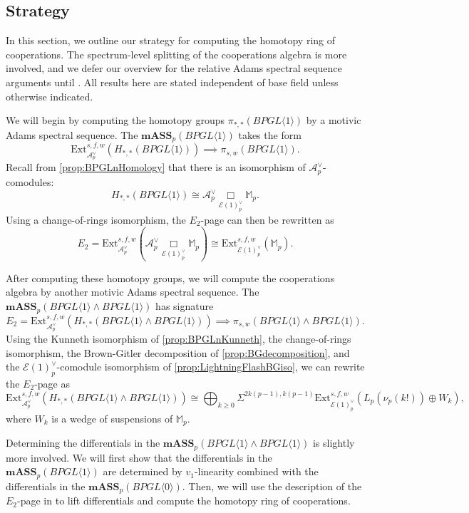 \documentclass{amsart}
\theoremstyle{plain}
\numberwithin{theorem}{section}
\numberwithin{equation}{section}
\numberwithin{figure}{section}
\newcommand{\0}{\langle 0 \rangle }
\begin{document}
\subsection{Strategy}
In this section, we outline our strategy for computing the homotopy ring of cooperations. The spectrum-level splitting of the cooperations algebra is more involved, and we defer our overview for the relative Adams spectral sequence arguments until . All results here are stated independent of base field unless otherwise indicated. 

We will begin by computing the homotopy groups $\pi_{*,*}(BPGL \langle 1 \rangle)$ by a motivic Adams spectral sequence. The $\textbf{mASS}_p(BPGL \langle 1 \rangle)$ takes the form
\[\text{Ext}^{s,f,w}_{\mathcal{A}_p^\vee}(H_{*,*}(BPGL \langle 1 \rangle)) \implies \pi_{s,w}(BPGL \langle 1 \rangle).\]
Recall from \cref{prop:BPGLnHomology} that there is an isomorphism of $\mathcal{A}^\vee_p$-comodules:
\[H_{*,*}(BPGL \langle 1 \rangle) \cong \mathcal{A}^\vee_p\underset{\mathcal{E}(1)^\vee_p}{\Box}\mathbb{M}_p.\]
Using a change-of-rings isomorphism, the $E_2$-page can then be rewritten as 
\[E_2 = \text{Ext}^{s,f,w}_{\mathcal{A}^\vee_p}(\mathcal{A}^\vee_p\underset{\mathcal{E}(1)^\vee_p}{\Box}\mathbb{M}_p) \cong \text{Ext}^{s,f,w}_{\mathcal{E}(1)^\vee_p}(\mathbb{M}_p).\]

After computing these homotopy groups, we will compute the cooperations algebra by another motivic Adams spectral sequence. The $\textbf{mASS}_p(BPGL \langle 1 \rangle \wedge BPGL \langle 1 \rangle)$ has signature
\[E_2 = \text{Ext}^{s,f,w}_{\mathcal{A}_p^\vee}(H_{*,*}(BPGL \langle 1 \rangle \wedge BPGL \langle 1 \rangle)) \implies \pi_{s,w}(BPGL \langle 1 \rangle \wedge BPGL \langle 1 \rangle).\]
Using the Kunneth isomorphism of \cref{prop:BPGLnKunneth}, the change-of-rings isomorphism, the Brown-Gitler decomposition of \cref{prop:BGdecomposition}, and the $\mathcal{E}(1)_p^\vee$-comodule isomorphism of \cref{prop:LightningFlashBGiso}, we can rewrite the $E_2$-page as
\begin{equation}
\label{bpgl1 coop e2}
\text{Ext}^{s,f,w}_{\mathcal{A}_p^\vee}(H_{*,*}(BPGL \langle 1 \rangle \wedge BPGL \langle 1 \rangle)) \cong \bigoplus_{k \geq 0}\Sigma^{2k(p-1), k(p-1)}\text{Ext}^{s,f,w}_{\mathcal{E}(1)^\vee_p}(L_p(\nu_p(k!)) \oplus W_k),
\end{equation}
where $W_k$ is a wedge of suspensions of $\mathbb{M}_p$.

Determining the differentials in the $\textbf{mASS}_p(BPGL \langle 1 \rangle \wedge BPGL \langle 1 \rangle)$ is slightly more involved. We will first show that the differentials in the $\textbf{mASS}_p(BPGL \langle 1 \rangle)$ are determined by $v_1$-linearity combined with the differentials in the $\textbf{mASS}_p(BPGL \langle 0 \rangle)$. Then, we will use the description of the $E_2$-page in  to lift differentials and compute the homotopy ring of cooperations.
\end{document}
